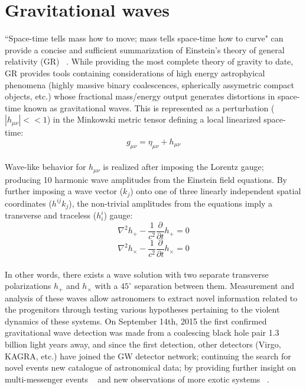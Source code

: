 \section{Gravitational waves}
``Space-time tells mass how to move; mass tells space-time how to curve" can provide a concise and sufficient summarization of Einstein's theory of general relativity (GR) ~\cite{Misner1973}. While providing the most complete theory of gravity to date, GR provides tools containing considerations of high energy astrophyical phenomena (highly massive binary coalescences, spherically assymetric compact objects, etc.) whose fractional mass/energy output generates distortions in space-time known as gravitational waves. 
This is represented as a perturbation ($|h_{\mu \nu}|<<1$) in the Minkowski metric tensor defining a local linearized space-time:
\\
$$g_{\mu \nu} = \eta_{\mu \nu} + h_{\mu \nu}$$
\\
Wave-like behavior for $h_{\mu \nu}$ is realized after imposing the Lorentz gauge; producing 10 harmonic wave amplitudes from the Einstein field equations. By further imposing a wave vector ($k_j$) onto one of three linearly independent spatial coordinates ($h^{ij}k_j$), the non-trivial amplitudes from the equations imply a transverse and traceless ($h^{i}_{i}$) gauge:
\\
$$\nabla^2 h_{+} - \frac{1}{c^2} \frac{\partial}{\partial t} h_{+} = 0$$
$$\nabla^2 h_{\times} - \frac{1}{c^2} \frac{\partial}{\partial t} h_{\times} = 0$$
\\
In other words, there exists a wave solution with two separate transverse polarizations $h_{+}$ and $h_{\times}$ with a $45^{\circ}$ separation between them. Measurement and analysis of these waves allow astronomers to extract novel information related to the progenitors through testing various hypotheses pertaining to the violent dynamics of these systems. On September 14th, 2015 the first confirmed gravitational wave detection was made from a coalescing black hole pair 1.3 billion light years away, and since the first detection, other detectors (Virgo, KAGRA, etc.) have joined the GW detector network; continuing the search for novel events new catalogue of astronomical data; by providing further insight on multi-messenger events ~\cite{gw170817} and new observations of more exotic systems ~\cite{Nitz_2023}.


\newpage
